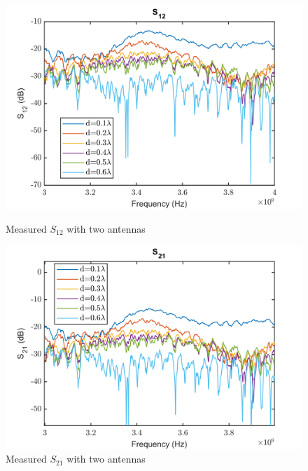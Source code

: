 \begin{figure}[H]
  \centering
  \begin{minipage}[b]{0.5\textwidth}
	\includegraphics[scale = 0.5]{figures/measurement/antennas/spar_two_ant_s12.png}
	\caption{Measured $S_{12}$ with two antennas}
    \label{fig:chamber_two_ant_s12}
  \end{minipage}
  \hfill
  \begin{minipage}[b]{0.4\textwidth}
\includegraphics[scale = 0.5]{figures/measurement/antennas/spar_two_ant_s21.png}
\caption{Measured $S_{21}$ with two antennas}
    \label{fig:chamber_two_ant_s21}
  \end{minipage}
\end{figure}


